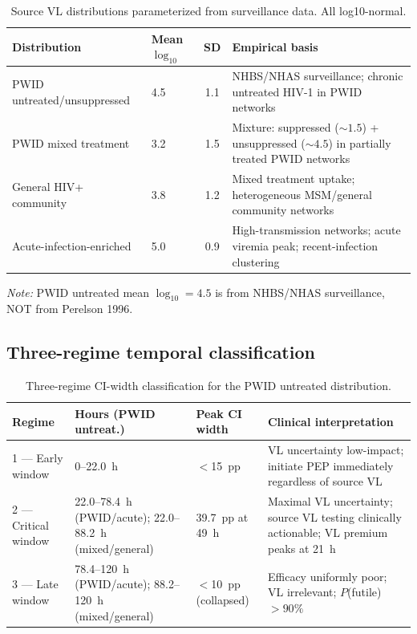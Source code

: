 \documentclass[11pt]{article}
\theoremstyle{definition}
\theoremstyle{remark}
\begin{document}
\begin{table}[H]
\centering
\small
\caption{Source VL distributions parameterized from surveillance data. All log10-normal.}
\begin{tabular}{@{}llcp{6cm}@{}}
\toprule
\textbf{Distribution} & \textbf{Mean $\log_{10}$} & \textbf{SD} & \textbf{Empirical basis} \\
\midrule
PWID untreated/unsuppressed & 4.5 & 1.1 & NHBS/NHAS surveillance; chronic untreated HIV-1 in PWID networks \\
PWID mixed treatment & 3.2 & 1.5 & Mixture: suppressed ($\sim 1.5$) + unsuppressed ($\sim 4.5$) in partially treated PWID networks \\
General HIV+ community & 3.8 & 1.2 & Mixed treatment uptake; heterogeneous MSM/general community networks \\
Acute-infection-enriched & 5.0 & 0.9 & High-transmission networks; acute viremia peak; recent-infection clustering \\
\bottomrule
\end{tabular}
\end{table}

\textit{Note:} PWID untreated mean $\log_{10} = 4.5$ is from NHBS/NHAS surveillance, NOT from Perelson 1996.

\subsection{Three-regime temporal classification}

\begin{table}[H]
\centering
\small
\caption{Three-regime CI-width classification for the PWID untreated distribution.}
\begin{tabular}{@{}lp{4cm}lp{5cm}@{}}
\toprule
\textbf{Regime} & \textbf{Hours (PWID untreat.)} & \textbf{Peak CI width} & \textbf{Clinical interpretation} \\
\midrule
1 --- Early window & 0--22.0~h & $<$15~pp & VL uncertainty low-impact; initiate PEP immediately regardless of source VL \\
2 --- Critical window & 22.0--78.4~h (PWID/acute); 22.0--88.2~h (mixed/general) & 39.7~pp at 49~h & Maximal VL uncertainty; source VL testing clinically actionable; VL premium peaks at 21~h \\
3 --- Late window & 78.4--120~h (PWID/acute); 88.2--120~h (mixed/general) & $<$10~pp (collapsed) & Efficacy uniformly poor; VL irrelevant; $P$(futile) $> 90\%$ \\
\bottomrule
\end{tabular}
\end{table}
\end{document}
